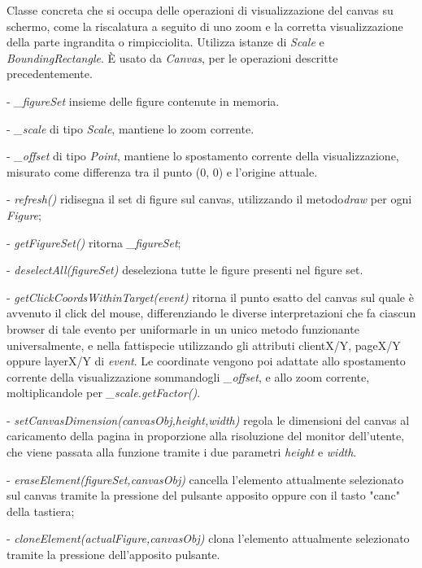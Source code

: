 Classe concreta che si occupa delle operazioni di visualizzazione del canvas su schermo, come la riscalatura a seguito di uno zoom e la corretta visualizzazione della parte ingrandita o rimpicciolita.
Utilizza istanze di \textit{Scale} e \textit{BoundingRectangle}.
\` E usato da \textit{Canvas}, per le operazioni descritte precedentemente.
\begin{elencopuntato}[\subsubsecindent]
\item[-] \textit{{\_}figureSet} insieme delle figure contenute in memoria.
\item[-] \textit{{\_}scale} di tipo \textit{Scale}, mantiene lo zoom corrente.
\item[-] \textit{{\_}offset} di tipo \textit{Point}, mantiene lo spostamento corrente della visualizzazione, misurato come differenza tra il punto (0, 0) e l'origine attuale.
\end{elencopuntato}
\begin{elencopuntato}[\subsubsecindent]
\item[-] \textit{refresh()} ridisegna il set di figure sul canvas, utilizzando il metodo\textit{draw} per ogni \textit{Figure};
\item[-] \textit{getFigureSet()} ritorna \textit{{\_}figureSet};
\item[-] \textit{deselectAll(figureSet)} deseleziona tutte le figure presenti nel figure set.
\item[-] \textit{getClickCoordsWithinTarget(event)} ritorna il punto esatto del canvas sul quale \`e avvenuto il click del mouse, differenziando le diverse interpretazioni che fa ciascun browser di tale evento per uniformarle in un unico metodo funzionante universalmente, e nella fattispecie utilizzando gli attributi clientX/Y, pageX/Y oppure layerX/Y di \textit{event}. 
Le coordinate vengono poi adattate allo spostamento corrente della visualizzazione sommandogli \textit{{\_}offset}, e allo zoom corrente, moltiplicandole per \textit{{\_}scale.getFactor()}.
\item[-] \textit{setCanvasDimension(canvasObj,height,width)} regola le dimensioni del canvas al caricamento della pagina in proporzione alla risoluzione del monitor dell'utente, che viene passata alla funzione tramite i due parametri \textit{height} e \textit{width}.
\item[-] \textit{eraseElement(figureSet,canvasObj)} cancella l'elemento attualmente selezionato sul canvas tramite la pressione del pulsante apposito oppure con il tasto "canc" della tastiera;
\item[-] \textit{cloneElement(actualFigure,canvasObj)} clona l'elemento attualmente selezionato tramite la pressione dell'apposito pulsante.
\end{elencopuntato}

